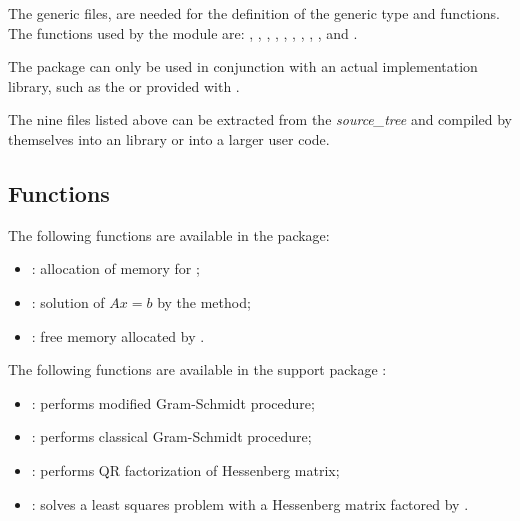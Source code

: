 The generic {\nvector} files,  are needed for the
definition of the generic  type and functions. 
The {\nvector} functions used by the {\spgmr} module are: 
, , , , , 
, , , , and
.

{\warn}The {\spgmr} package can only be used in conjunction with an actual {\nvector} 
implementation library, such as the {\nvecs} or {\nvecp} provided with {\sundials}.

The nine files listed above can be extracted from the {\sundials} {\em source\_tree} and
compiled by themselves into an {\spgmr} library or into a larger user code.
 
\subsection{Functions}
The following functions are available in the {\spgmr} package:  
\begin{itemize}
\item {}: allocation of memory for ;
\item {}: solution of $Ax = b$ by the {\spgmr} method;
\item {}: free memory allocated by .
\end{itemize}
%
The following functions are available in the support package 
:
\begin{itemize}
\item {}: performs modified Gram-Schmidt procedure;
\item {}: performs classical Gram-Schmidt procedure; 
\item {}: performs QR factorization of Hessenberg matrix;
\item {}: solves a least squares problem with a Hessenberg
       matrix factored by .
\end{itemize}
